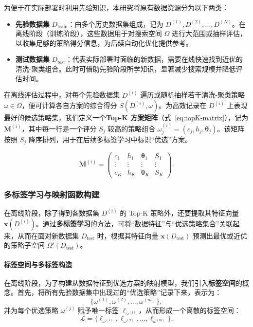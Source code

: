 \documentclass[10pt]{article} %
\numberwithin{equation}{section}
\begin{document}
为便于在实际部署时利用先验知识，本研究将原有数据资源分为以下两类：
\begin{itemize}
    \item \textbf{先验数据集} $D_{\text{train}}$：由多个历史数据集组成，记为 ${D^{(1)}, D^{(2)}, \dots, D^{(N)}}$。在离线阶段（训练阶段），这些数据用于对搜索空间 $\Omega$ 进行大范围或抽样评估，以收集足够的策略得分信息，为后续自动化优化提供参考。
    \item \textbf{测试数据集} $D_{\text{test}}$：代表实际部署时面临的新数据，需要在线快速找到近优的清洗-聚类组合。此时可借助先验阶段所学知识，显著减少搜索规模并降低评估时间。
\end{itemize}

在离线评估过程中，对每个先验数据集 $D^{(i)}$ 遍历或随机抽样若干清洗-聚类策略 $\omega \in \Omega$，便可计算各自方案的综合得分 $S(D^{(i)}, \omega)$。为高效记录在 $D^{(i)}$ 上表现最好的候选策略集，我们定义一个\textbf{Top-K 方案矩阵}（式~\eqref{eq:topK-matrix}），记为 $\mathbf{M}^{(i)}$，其中每一行是一个评分 $S_j$ 较高的策略组合 $\omega_j^{(i)}=(c_j,h_j,\boldsymbol{\theta}_j)$。该矩阵按照 $S_j$ 降序排列，用于在后续多标签学习中标识“优选”方案。

\begin{equation}\label{eq:topK-matrix}
\mathbf{M}^{(i)} 
= 
\begin{pmatrix}
c_1 & h_1 & \boldsymbol{\theta}_1 & S_1 \\
\vdots & \vdots & \vdots & \vdots \\
c_K & h_K & \boldsymbol{\theta}_K & S_K
\end{pmatrix}.
\end{equation}

\subsubsection{多标签学习与映射函数构建}
\label{subsec:multi-label}

在离线阶段，除了得到各数据集 $D^{(i)}$ 的 Top-K 策略外，还要提取其特征向量 $\mathbf{x}(D^{(i)})$。通过\textbf{多标签学习}的方法，可将“数据特征”与“优选策略集合”关联起来，从而在面对新数据集 $D_{\text{test}}$ 时，根据其特征向量 $\mathbf{x}(D_{\text{test}})$ 预测出最优或近优的策略子空间 $\Omega'(D_{\text{test}})$。

\paragraph{标签空间与多标签构造}  
在离线阶段，为了构建从数据特征到优选方案的映射模型，我们引入\textbf{标签空间}的概念。首先，将所有先验数据集中出现过的“优选策略”记录下来，表示为：
\[
\{\omega^{(1)}, \omega^{(2)}, \ldots, \omega^{(m)}\},
\]
并为每个优选策略 $\omega^{(j)}$ 赋予唯一标签 $\ell_{\omega^{(j)}}$，从而形成一个离散的标签空间：
\begin{equation}\label{eq:label-space}
\mathcal{L}
= \{\ell_{\omega^{(1)}}, \ell_{\omega^{(2)}}, \ldots, \ell_{\omega^{(m)}}\}.
\end{equation}
\end{document}

